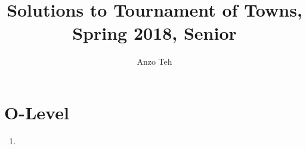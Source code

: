 \documentclass[11pt,a4paper]{article}
\begin{document}
\newcommand{\la}{\leftarrow}
\newcommand{\lra}{\leftrightarrow}
\newcommand{\bbN}{\mathbb{N}}
\newcommand{\bbZ}{\mathbb{Z}}
\newcommand{\dsum}{\displaystyle\sum}
\newcommand{\dprod}{\displaystyle\prod}


\title{Solutions to Tournament of Towns, Spring 2018, Senior}
\author{Anzo Teh}
\date{}
\maketitle

\section*{O-Level}
\begin{enumerate}
	\item
\end{enumerate}
\end{document}
